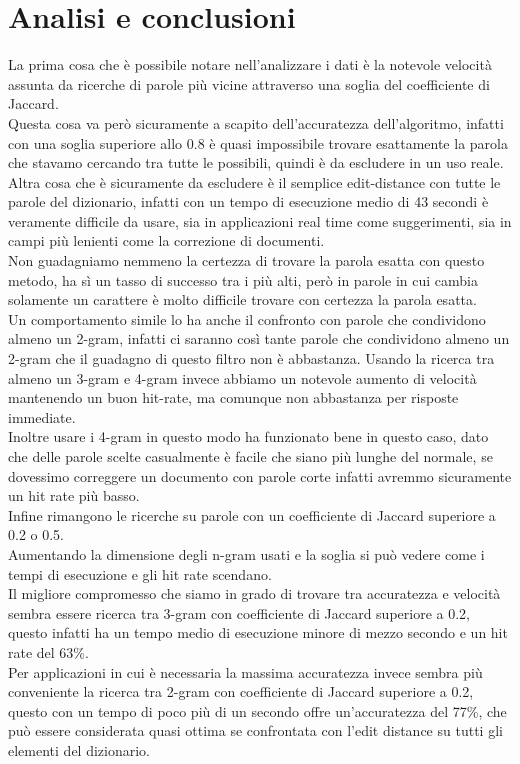 \documentclass[]{article}
\begin{document}
\section{Analisi e conclusioni}
La prima cosa che è possibile notare nell'analizzare i dati è la notevole velocità assunta da ricerche di parole più vicine attraverso una soglia del coefficiente di Jaccard.\\
Questa cosa va però sicuramente a scapito dell'accuratezza dell'algoritmo, infatti con una soglia superiore allo 0.8 è quasi impossibile trovare esattamente la parola che stavamo cercando tra tutte le possibili, quindi è da escludere in un uso reale.\\
Altra cosa che è sicuramente da escludere è il semplice edit-distance con tutte le parole del dizionario, infatti con un tempo di esecuzione medio di 43 secondi è veramente difficile da usare, sia in applicazioni real time come suggerimenti, sia in campi più lenienti come la correzione di documenti.\\
Non guadagniamo nemmeno la certezza di trovare la parola esatta con questo metodo, ha sì un tasso di successo tra i più alti, però in parole in cui cambia solamente un carattere è molto difficile trovare con certezza la parola esatta.\\
Un comportamento simile lo ha anche il confronto con parole che condividono almeno un 2-gram, infatti ci saranno così tante parole che condividono almeno un 2-gram che il guadagno di questo filtro non è abbastanza.
Usando la ricerca tra almeno un 3-gram e 4-gram invece abbiamo un notevole aumento di velocità mantenendo un buon hit-rate, ma comunque non abbastanza per risposte immediate.\\
Inoltre usare i 4-gram in questo modo ha funzionato bene in questo caso, dato che delle parole scelte casualmente è facile che siano più lunghe del normale, se dovessimo correggere un documento con parole corte infatti avremmo sicuramente un hit rate più basso.\\
Infine rimangono le ricerche su parole con un coefficiente di Jaccard superiore a 0.2 o 0.5.\\
Aumentando la dimensione degli n-gram usati e la soglia si può vedere come i tempi di esecuzione e gli hit rate scendano.\\
Il migliore compromesso che siamo in grado di trovare tra accuratezza e velocità sembra essere ricerca tra 3-gram con coefficiente di Jaccard superiore a 0.2, questo infatti ha un tempo medio di esecuzione minore di mezzo secondo e un hit rate del 63\%.\\
Per applicazioni in cui è necessaria la massima accuratezza invece sembra più conveniente la ricerca tra 2-gram con coefficiente di Jaccard superiore a 0.2, questo con un tempo di poco più di un secondo offre un'accuratezza del 77\%, che può essere considerata quasi ottima se confrontata con l'edit distance su tutti gli elementi del dizionario.\\ 
\end{document}

